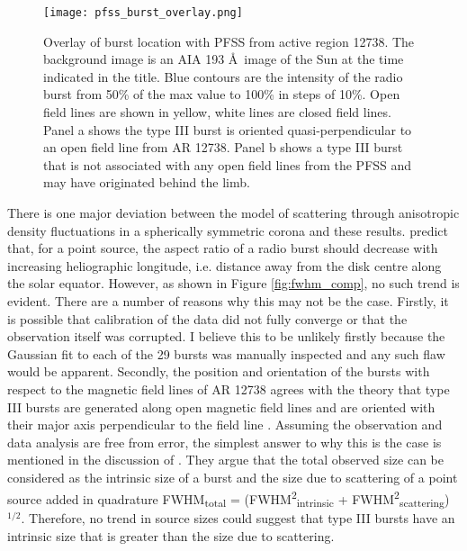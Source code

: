 \begin{figure}[ht]
\centering
\texttt{[image: pfss\_burst\_overlay.png]}
\caption[Overlay of burst location with PFSS from active region 12738.]{Overlay of burst location with PFSS from active region 12738. The background image is an AIA 193 \AA \ image of the Sun at the time indicated in the title. Blue contours are the intensity of the radio burst from 50\% of the max value to 100\% in steps of 10\%. Open field lines are shown in yellow, white lines are closed field lines. Panel a shows the type III burst is oriented quasi-perpendicular to an open field line from AR 12738. Panel b shows a type III burst that is not associated with any open field lines from the PFSS and may have originated behind the limb.}
\label{fig:pfss_overlay}
\end{figure}

There is one major deviation between the model of scattering through anisotropic density fluctuations in a spherically symmetric corona and these results. \cite{Kontar2019} predict that, for a point source, the aspect ratio of a radio burst should decrease with increasing heliographic longitude, i.e. distance away from the disk centre along the solar equator. However, as shown in Figure \ref{fig:fwhm_comp}, no such trend is evident.  
There are a number of reasons why this may not be the case. Firstly, it is possible that calibration of the data did not fully converge or that the observation itself was corrupted. I believe this to be unlikely firstly because the Gaussian fit to each of the 29 bursts was manually inspected and any such flaw would be apparent. Secondly, the position and orientation of the bursts with respect to the magnetic field lines of AR 12738 agrees with the theory that type III bursts are generated along open magnetic field lines \citep{Wild1950a, Wild1950d} and are oriented with their major axis perpendicular to the field line \citep{Anantharamaiah1994}. 
Assuming the observation and data analysis are free from error, the simplest answer to why this is the case is mentioned in the discussion of \cite{Kontar2019}. They argue that the total observed size can be considered as the intrinsic size of a burst and the size due to scattering of a point source added in quadrature FWHM\textsubscript{total} = (FWHM\textsuperscript{2}\textsubscript{intrinsic} + FWHM\textsuperscript{2}\textsubscript{scattering})$^{1/2}$. Therefore, no trend in source sizes could suggest that type III bursts have an intrinsic size that is greater than the size due to scattering. 

